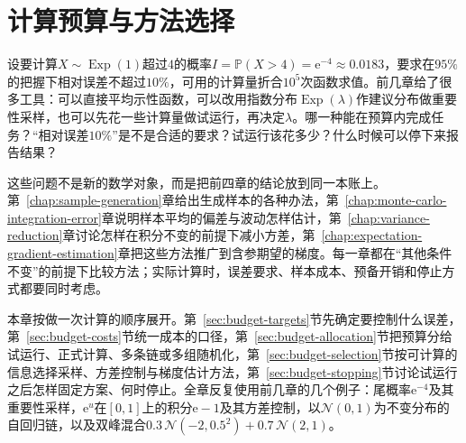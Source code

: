 \chapter{计算预算与方法选择}
\label{chap:sampling-budget-method-selection}

设要计算$X\sim\operatorname{Exp}(1)$超过$4$的概率$I=\mathbb{P}(X>4)=\mathrm{e}^{-4}\approx0.0183$，要求在$95\%$的把握下相对误差不超过$10\%$，可用的计算量折合$10^{5}$次函数求值。前几章给了很多工具：可以直接平均示性函数，可以改用指数分布$\operatorname{Exp}(\lambda)$作建议分布做重要性采样，也可以先花一些计算量做试运行，再决定$\lambda$。哪一种能在预算内完成任务？“相对误差$10\%$”是不是合适的要求？试运行该花多少？什么时候可以停下来报告结果？

这些问题不是新的数学对象，而是把前四章的结论放到同一本账上。第~\ref{chap:sample-generation}章给出生成样本的各种办法，第~\ref{chap:monte-carlo-integration-error}章说明样本平均的偏差与波动怎样估计，第~\ref{chap:variance-reduction}章讨论怎样在积分不变的前提下减小方差，第~\ref{chap:expectation-gradient-estimation}章把这些方法推广到含参期望的梯度。每一章都在“其他条件不变”的前提下比较方法；实际计算时，误差要求、样本成本、预备开销和停止方式都要同时考虑。

本章按做一次计算的顺序展开。第~\ref{sec:budget-targets}节先确定要控制什么误差，第~\ref{sec:budget-costs}节统一成本的口径，第~\ref{sec:budget-allocation}节把预算分给试运行、正式计算、多条链或多组随机化，第~\ref{sec:budget-selection}节按可计算的信息选择采样、方差控制与梯度估计方法，第~\ref{sec:budget-stopping}节讨论试运行之后怎样固定方案、何时停止。全章反复使用前几章的几个例子：尾概率$\mathrm{e}^{-4}$及其重要性采样，$\mathrm{e}^{u}$在$[0,1]$上的积分$\mathrm{e}-1$及其方差控制，以$\mathcal{N}(0,1)$为不变分布的自回归链，以及双峰混合$0.3\,\mathcal{N}(-2,0.5^{2})+0.7\,\mathcal{N}(2,1)$。








